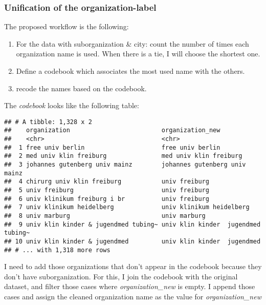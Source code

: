 \documentclass[]{article}
\providecommand{\tightlist}{%
  \setlength{\itemsep}{0pt}\setlength{\parskip}{0pt}}
\begin{document}
\subsubsection{Unification of the organization-label}

The proposed workflow is the following:

\begin{enumerate}
\def\labelenumi{\arabic{enumi}.}
\tightlist
\item
  For the data with suborganization \& city: count the number of times
  each organization name is used. When there is a tie, I will choose the
  shortest one.
\item
  Define a codebook which associates the most used name with the others.
\item
  recode the names based on the codebook.
\end{enumerate}

The \textit{codebook} looks like the following table:

\begin{verbatim}
## # A tibble: 1,328 x 2
##    organization                         organization_new                   
##    <chr>                                <chr>                              
##  1 free univ berlin                     free univ berlin                   
##  2 med univ klin freiburg               med univ klin freiburg             
##  3 johannes gutenberg univ mainz        johannes gutenberg univ mainz      
##  4 chirurg univ klin freiburg           univ freiburg                      
##  5 univ freiburg                        univ freiburg                      
##  6 univ klinikum freiburg i br          univ freiburg                      
##  7 univ klinikum heidelberg             univ klinikum heidelberg           
##  8 univ marburg                         univ marburg                       
##  9 univ klin kinder & jugendmed tubing~ univ klin kinder  jugendmed tubing~
## 10 univ klin kinder & jugendmed         univ klin kinder  jugendmed        
## # ... with 1,318 more rows
\end{verbatim}

I need to add those organizations that don't appear in the codebook because they don't have suborganization. For this, I join the codebook with the original dataset, and filter those cases where \textit{organization\_new} is empty. I append those cases and assign the cleaned organization name as the value for \textit{organization\_new}

\medskip
\end{document}

